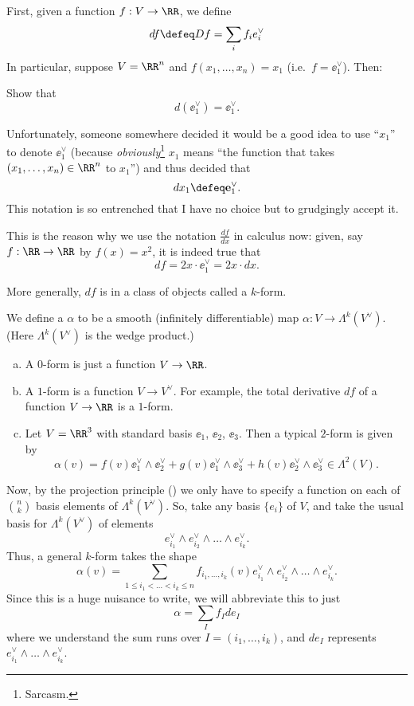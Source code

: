 First, given a function $f : V \to \RR$,
we define 
\[ df \defeq Df = \sum_i f_i e_i^\vee \]
In particular, suppose $V = \RR^n$ and $f(x_1, \dots, x_n) = x_1$ (i.e.\ $f = \ee_1^\vee$). Then:
\begin{ques}
	Show that \[ d(\ee_1^\vee) = \ee_1^\vee. \]
\end{ques}
\begin{abuse}
	Unfortunately, someone somewhere decided it would be a good idea to use ``$x_1$'' to denote $\ee_1^\vee$
	(because \emph{obviously}\footnote{Sarcasm.} $x_1$ means
	``the function that takes $(x_1, \dots, x_n) \in \RR^n$ to $x_1$'')
	and thus decided that \[ dx_1 \defeq \ee_1^\vee. \]
	This notation is so entrenched that I have no choice but to grudgingly accept it.
	\label{abuse:dx}
\end{abuse}
\begin{remark}
	This is the reason why we use the notation $\frac{df}{dx}$ in calculus now:
	given, say $f : \RR \to \RR$ by $f(x) = x^2$, it is indeed true that
	\[ df = 2x \cdot \ee_1^\vee = 2x \cdot dx. \]
\end{remark}

More generally, $df$ is in a class of objects called a $k$-form.
\begin{definition}
	We define a  $\alpha$ to be a smooth (infinitely differentiable)
	map $\alpha : V \to \Lambda^k(V^\vee)$.
	(Here $\Lambda^k(V^\vee)$ is the wedge product.)
\end{definition}

\begin{example}
	[$k$-forms for $k=0,1$]
	\listhack
	\begin{enumerate}[(a)]
		\item A $0$-form is just a function $V \to \RR$.
		\item A $1$-form is a function $V \to V^\vee$.
		For example, the total derivative $df$ of a function $V \to \RR$ is a $1$-form.
		\item Let $V = \RR^3$ with standard basis $\ee_1$, $\ee_2$, $\ee_3$.
		Then a typical $2$-form is given by
		\[
			\alpha(v)
			=
			f(v) \ee_1^\vee \wedge \ee_2^\vee
			+ g(v) \ee_1^\vee \wedge \ee_3^\vee
			+ h(v) \ee_2^\vee \wedge \ee_3^\vee
			\in \Lambda^2(V).
		\]
	\end{enumerate}
\end{example}

Now, by the projection principle () we only have to specify
a function on each of $\binom nk$ basis elements of $\Lambda^k(V^\vee)$.
So, take any basis $\{e_i\}$ of $V$, and 
take the usual basis for $\Lambda^k(V^\vee)$ of elements
\[ e_{i_1}^\vee \wedge e_{i_2}^\vee \wedge \dots \wedge e_{i_k}^\vee. \]
Thus, a general $k$-form takes the shape
\[ \alpha(v) = \sum_{1 \le i_1 < \dots < i_k \le n} 
	f_{i_1, \dots, i_k}(v)
	e_{i_1}^\vee \wedge e_{i_2}^\vee \wedge \dots \wedge e_{i_k}^\vee. \]
Since this is a huge nuisance to write, we will abbreviate this to just
\[ \alpha = \sum_I f_I de_I \]
where we understand the sum runs over $I = (i_1, \dots, i_k)$,
and $de_I$ represents $e_{i_1}^\vee \wedge \dots \wedge e_{i_k}^\vee$.

